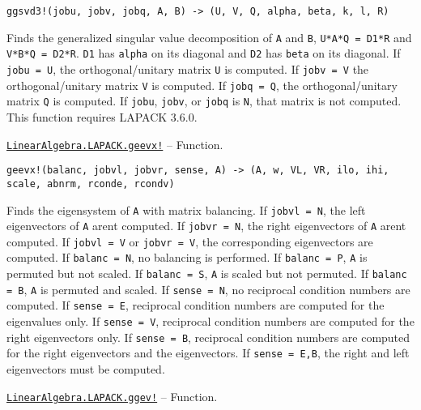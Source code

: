 \begin{adjustwidth}{2em}{0pt}


\begin{verbatim}
ggsvd3!(jobu, jobv, jobq, A, B) -> (U, V, Q, alpha, beta, k, l, R)
\end{verbatim}

Finds the generalized singular value decomposition of \texttt{A} and \texttt{B}, \texttt{U{\textquotesingle}*A*Q = D1*R} and \texttt{V{\textquotesingle}*B*Q = D2*R}. \texttt{D1} has \texttt{alpha} on its diagonal and \texttt{D2} has \texttt{beta} on its diagonal. If \texttt{jobu = U}, the orthogonal/unitary matrix \texttt{U} is computed. If \texttt{jobv = V} the orthogonal/unitary matrix \texttt{V} is computed. If \texttt{jobq = Q}, the orthogonal/unitary matrix \texttt{Q} is computed. If \texttt{jobu}, \texttt{jobv}, or \texttt{jobq} is \texttt{N}, that matrix is not computed. This function requires LAPACK 3.6.0.



\end{adjustwidth}
\hypertarget{13160568642977439323}{}
\hyperlink{13160568642977439323}{\texttt{LinearAlgebra.LAPACK.geevx!}}  -- {Function.}

\begin{adjustwidth}{2em}{0pt}


\begin{verbatim}
geevx!(balanc, jobvl, jobvr, sense, A) -> (A, w, VL, VR, ilo, ihi, scale, abnrm, rconde, rcondv)
\end{verbatim}

Finds the eigensystem of \texttt{A} with matrix balancing. If \texttt{jobvl = N}, the left eigenvectors of \texttt{A} aren{\textquotesingle}t computed. If \texttt{jobvr = N}, the right eigenvectors of \texttt{A} aren{\textquotesingle}t computed. If \texttt{jobvl = V} or \texttt{jobvr = V}, the corresponding eigenvectors are computed. If \texttt{balanc = N}, no balancing is performed. If \texttt{balanc = P}, \texttt{A} is permuted but not scaled. If \texttt{balanc = S}, \texttt{A} is scaled but not permuted. If \texttt{balanc = B}, \texttt{A} is permuted and scaled. If \texttt{sense = N}, no reciprocal condition numbers are computed. If \texttt{sense = E}, reciprocal condition numbers are computed for the eigenvalues only. If \texttt{sense = V}, reciprocal condition numbers are computed for the right eigenvectors only. If \texttt{sense = B}, reciprocal condition numbers are computed for the right eigenvectors and the eigenvectors. If \texttt{sense = E,B}, the right and left eigenvectors must be computed.



\end{adjustwidth}
\hypertarget{11158917129247885932}{}
\hyperlink{11158917129247885932}{\texttt{LinearAlgebra.LAPACK.ggev!}}  -- {Function.}


